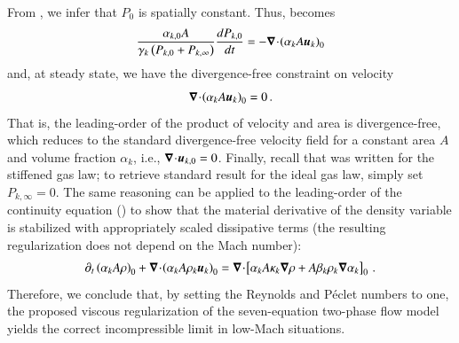 \documentclass[preprint,10pt]{elsarticle}
\begin{document}
%
From , we infer that $P_0$ is spatially constant. Thus,  becomes
%
\begin{equation}\label{eq:div_free_energy}
\frac{\alpha_{k,0}  A}{\gamma_k\left( P_{k,0} + P_{k,\infty} \right)} \frac{d P_{k,0}}{dt} = - \boldsymbol\nabla\! \cdot \! \left( \alpha_k A \boldsymbol u_k \right)_0 
\end{equation}
%
and, at steady state, we have the divergence-free constraint on velocity
%
\begin{equation}
\boldsymbol\nabla\! \cdot \! \left( \alpha_k A \boldsymbol u_k \right)_0  = 0 \, .
\end{equation}
%
That is, the leading-order of the product of velocity and area is divergence-free, which reduces to the standard divergence-free 
velocity field for a constant area $A$ and volume fraction $\alpha_k$, i.e., $\boldsymbol\nabla\! \cdot \! \boldsymbol u_{k,0}=0$. Finally, recall that 
 was written for the stiffened gas law; to retrieve standard result for the ideal gas law, simply set $P_{k,\infty}=0$. 
%
The same reasoning can be applied to the leading-order 
of the continuity equation () to show that the material derivative of the density variable is stabilized with 
appropriately scaled dissipative terms (the resulting regularization does not depend on the Mach number):
\begin{multline}
\partial_t \left( \alpha_k A \rho\right)_0 + \boldsymbol\nabla\! \cdot \! \left( \alpha_k A \rho_k \boldsymbol u_k \right)_0 =
\boldsymbol\nabla\! \cdot \! \left[ \alpha_k A \kappa_k \boldsymbol\nabla \rho + A \beta_k \rho_k \boldsymbol\nabla \alpha_k \right]_0 \, .
\end{multline}
%
Therefore, we conclude that, by setting the Reynolds and P\'eclet numbers to one, the proposed viscous regularization
of the seven-equation two-phase flow model yields the correct incompressible limit in low-Mach situations.
%
\end{document}
